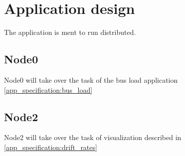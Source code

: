 \section{Application design}

The application is ment to run distributed.

\subsection{Node0}
Node0 will take over the task of the bus load application
\ref{app_specification:bus_load} 

\subsection{Node2}
Node2 will take over the task of visualization described in
\ref{app_specification:drift_rates} 
